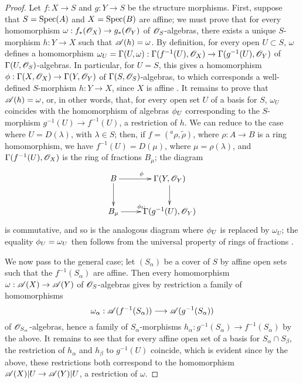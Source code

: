 \begin{proof}
Let $f:X\to S$ and $g:Y\to S$ be the structure morphisms.
First, suppose that $S=\operatorname{Spec}(A)$ and $X=\operatorname{Spec}(B)$ are affine; we must prove that for every homomorphism $\omega:f_*(\sh{O}_X)\to g_*(\sh{O}_Y)$ of $\mathscr{O}_S$-algebras, there exists a unique $S$-morphism $h:Y\to X$ such that $\mathscr{A}(h)=\omega$.
By definition, for every open $U\subset S$, $\omega$ defines a homomorphism $\omega_U=\Gamma(U,\omega):\Gamma(f^{-1}(U),\sh{O}_X)\to\Gamma(g^{-1}(U),\sh{O}_Y)$ of $\Gamma(U,\mathscr{O}_S)$-algebras.
In particular, for $U=S$, this gives a homomorphism $\vphi:\Gamma(X,\sh{O}_X)\to\Gamma(Y,\sh{O}_Y)$ of $\Gamma(S,\mathscr{O}_S)$-algebras, to which corresponds a well-defined $S$-morphism $h:Y\to X$, since $X$ is affine .
It remains to prove that $\mathscr{A}(h)=\omega$, or, in other words, that, for every open set $U$ of a basis for $S$, $\omega_U$ coincides with the homomorphism of algebras $\phi_U$ corresponding to the $S$-morphism $g^{-1}(U)\to f^{-1}(U)$, a restriction of $h$.
We can reduce to the case where $U=D(\lambda)$, with $\lambda\in S$; then, if $f=({}^a\rho,\widetilde{\rho})$, where $\rho:A\to B$ is a ring homomorphism, we have $f^{-1}(U)=D(\mu)$, where $\mu=\rho(\lambda)$, and $\Gamma(f^{-1}(U),\mathscr{O}_X)$ is the ring of fractions $B_\mu$; the diagram
\[
  \xymatrix{
    B\ar[r]^\vphi\ar[d] &
    \Gamma(Y,\sh{O}_Y)\ar[d]\\
    B_\mu\ar[r]^{\vphi_U} &
    \Gamma(g^{-1}(U),\sh{O}_Y)
  }
\]
is commutative, and so is the analogous diagram where $\phi_U$ is replaced by $\omega_U$; the equality $\phi_U=\omega_U$ then follows from the universal property of rings of fractions .

We now pass to the general case; let $(S_\alpha)$ be a cover of $S$ by affine open sets
such that the $f^{-1}(S_\alpha)$ are affine.
Then every homomorphism $\omega:\sh{A}(X)\to\sh{A}(Y)$ of $\mathscr{O}_S$-algebras gives by restriction a family of homomorphisms
\[
  \omega_\alpha:\sh{A}(f^{-1}(S_\alpha))\to\sh{A}(g^{-1}(S_\alpha))
\]
of $\mathscr{O}_{S_\alpha}$-algebras, hence a family of $S_\alpha$-morphisms $h_\alpha:g^{-1}(S_\alpha)\to f^{-1}(S_\alpha)$ by the above.
It remains to see that for every affine open set of a basis for $S_\alpha\cap S_\beta$, the restriction of $h_\alpha$ and $h_\beta$ to $g^{-1}(U)$ coincide, which is evident since by the above, these restrictions both correspond to the homomorphism $\sh{A}(X)|U\to\sh{A}(Y)|U$, a restriction of $\omega$.
\end{proof}

